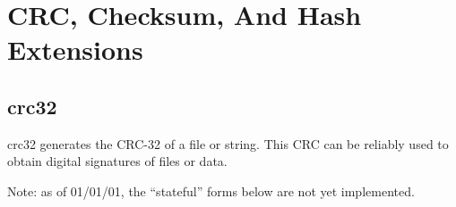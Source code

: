 \section{CRC, Checksum, And Hash Extensions}


\subsection{crc32}
\label{cxtn0:scrc0:scrc0}


\begin{tclcommandname}{crc32}%
generates the CRC-32 of a file or string.  This CRC can be reliably used to obtain
digital signatures of files or data.
\end{tclcommandname}

\begin{tclcommandsynopsis}

Note:  as of 01/01/01, the ``stateful'' forms below are not yet implemented.

\end{tclcommandsynopsis}

